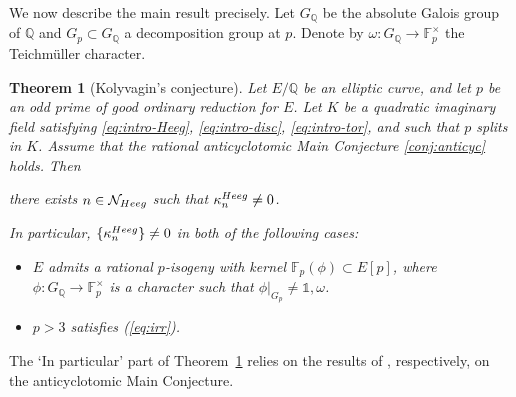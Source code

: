 \documentclass[10pt,reqno]{amsart}
\numberwithin{equation}{section}
\theoremstyle{plain}
\theoremstyle{definition}
\theoremstyle{definition}
\theoremstyle{plain}
\theoremstyle{plain}
\theoremstyle{plain}
\theoremstyle{plain}
\theoremstyle{plain}
\newtheorem{thmintro}{Theorem}
\theoremstyle{plain}
\newcommand{\Q}{\mathbb{Q}}
\begin{document}
We now describe the main result
 precisely. %
Let 
$G_{\Q}$ be the absolute Galois group of $\Q$ and 
$G_p\subset G_\Q$ a decomposition group at $p$. 
Denote by $\omega:G_\Q\rightarrow\mathbb{F}_p^\times$ the Teichm\"{u}ller character. 
%


\begin{thmintro}[Kolyvagin's conjecture]\label{thmintroKoly}
Let $E/\Q$ be an elliptic curve, and let $p$ be an odd prime of good ordinary reduction for $E$. Let $K$ be a quadratic imaginary field satisfying \eqref{eq:intro-Heeg}, \eqref{eq:intro-disc}, \eqref{eq:intro-tor}, and such that $p$ splits in $K$. Assume that the rational anticyclotomic Main Conjecture \ref{conj:anticyc} holds.
 Then 
\begin{center}
there exists $n\in\mathcal{N}_{\rm Heeg}$ such that $\kappa_{n}^{\rm Heeg}\neq 0$. 
\end{center}
In particular, 
$\{\kappa_{n}^{\rm Heeg}\}\neq 0$ in both of the following cases:
\begin{itemize}
\item[$\circ$] $E$ admits a rational $p$-isogeny with kernel $\mathbb{F}_p(\phi)\subset E[p]$, where $\phi:G_\Q \to \mathbb{F}_p^{\times}$ is a character such that $\phi|_{G_p}\neq\mathds{1},\omega$. 
\item[$\circ$] $p>3$ satisfies {\rm (\ref{eq:irr})}.
\end{itemize}
\end{thmintro}

The `In particular' part 
of Theorem~\ref{thmintroKoly}
relies on the results of \cite{eisenstein_cyc,bcs}, respectively, on 
the anticyclotomic Main Conjecture.
\end{document}
